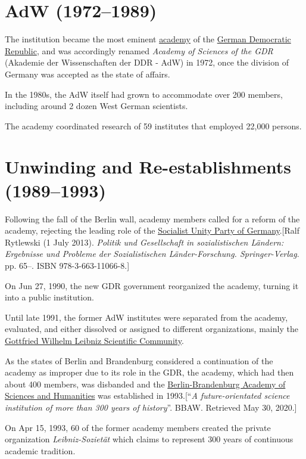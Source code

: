 \documentclass{book}
\numberwithin{equation}{section}
\begin{document}
\section{AdW (1972--1989)}
The institution became the most eminent \href{https://en.wikipedia.org/wiki/Academy}{academy} of the \href{https://en.wikipedia.org/wiki/East_Germany}{German Democratic Republic}, and was accordingly renamed \textit{Academy of Sciences of the GDR} (Akademie der Wissenschaften der DDR - AdW) in 1972, once the division of Germany was accepted as the state of affairs.

In the 1980s, the AdW itself had grown to accommodate over 200 members, including around 2 dozen West German scientists.

The academy coordinated research of 59 institutes that employed 22,000 persons.

\section{Unwinding and Re-establishments (1989--1993)}
Following the fall of the Berlin wall, academy members called for a reform of the academy, rejecting the leading role of the \href{https://en.wikipedia.org/wiki/Socialist_Unity_Party_of_Germany}{Socialist Unity Party of Germany}.[Ralf Rytlewski (1 July 2013). \textit{Politik und Gesellschaft in sozialistischen Ländern: Ergebnisse und Probleme der Sozialistischen Länder-Forschung. Springer-Verlag}. pp. 65--. ISBN 978-3-663-11066-8.]

%
On Jun 27, 1990, the new GDR government reorganized the academy, turning it into a public institution.

Until late 1991, the former AdW institutes were separated from the academy, evaluated, and either dissolved or assigned to different organizations, mainly the \href{https://en.wikipedia.org/wiki/Gottfried_Wilhelm_Leibniz_Scientific_Community}{Gottfried Wilhelm Leibniz Scientific Community}.

As the states of Berlin and Brandenburg considered a continuation of the academy as improper due to its role in the GDR, the academy, which had then about 400 members, was disbanded and the \href{https://en.wikipedia.org/wiki/Berlin-Brandenburg_Academy_of_Sciences_and_Humanities}{Berlin-Brandenburg Academy of Sciences and Humanities} was established in 1993.[``\textit{A future-orientated science institution of more than 300 years of history}''. BBAW. Retrieved May 30, 2020.]

%
On Apr 15, 1993, 60 of the former academy members created the private organization \textit{Leibniz-Sozietät} which claims to represent 300 years of continuous academic tradition.
\end{document}
